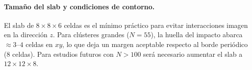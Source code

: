 \paragraph{Tamaño del slab y condiciones de contorno.}
El slab de $8\times8\times6$ celdas es el mínimo práctico para evitar
interacciones imagen en la dirección $z$. Para clústeres grandes ($N=55$),
la huella del impacto abarca $\approx 3$--$4$ celdas en $xy$, lo que deja
un margen aceptable respecto al borde periódico ($8$ celdas). Para estudios
futuros con $N > 100$ será necesario aumentar el slab a $12\times12\times8$.
